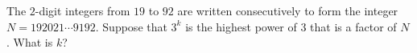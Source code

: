 The $2$-digit integers from $19$ to $92$ are written consecutively to form the integer $N=192021\cdots9192$. Suppose that $3^k$ is the highest power of $3$ that is a factor of $N$. What is $k$?

